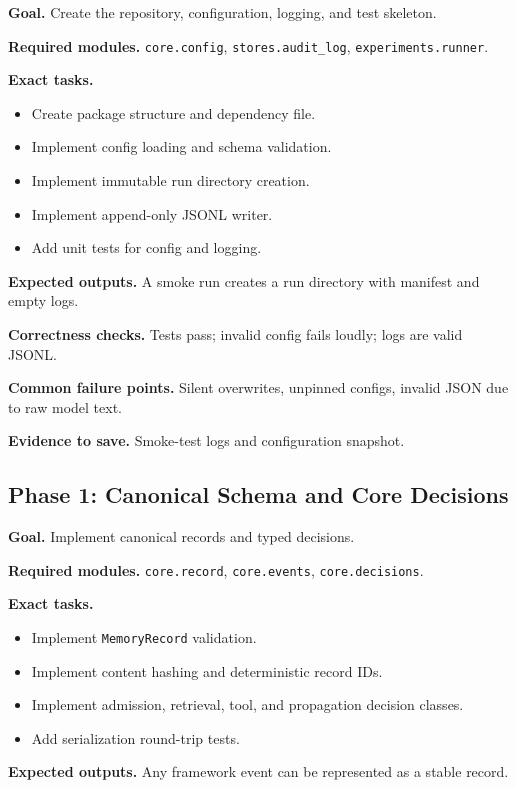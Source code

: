 \documentclass[11pt,oneside]{report}
\begin{document}
\textbf{Goal.} Create the repository, configuration, logging, and test skeleton.

\textbf{Required modules.} \texttt{core.config}, \texttt{stores.audit\_log},
\texttt{experiments.runner}.

\textbf{Exact tasks.}
\begin{itemize}
  \item Create package structure and dependency file.
  \item Implement config loading and schema validation.
  \item Implement immutable run directory creation.
  \item Implement append-only JSONL writer.
  \item Add unit tests for config and logging.
\end{itemize}

\textbf{Expected outputs.} A smoke run creates a run directory with manifest and empty logs.

\textbf{Correctness checks.} Tests pass; invalid config fails loudly; logs are valid JSONL.

\textbf{Common failure points.} Silent overwrites, unpinned configs, invalid JSON due to raw model
text.

\textbf{Evidence to save.} Smoke-test logs and configuration snapshot.

\subsection{Phase 1: Canonical Schema and Core Decisions}

\textbf{Goal.} Implement canonical records and typed decisions.

\textbf{Required modules.} \texttt{core.record}, \texttt{core.events},
\texttt{core.decisions}.

\textbf{Exact tasks.}
\begin{itemize}
  \item Implement \texttt{MemoryRecord} validation.
  \item Implement content hashing and deterministic record IDs.
  \item Implement admission, retrieval, tool, and propagation decision classes.
  \item Add serialization round-trip tests.
\end{itemize}

\textbf{Expected outputs.} Any framework event can be represented as a stable record.
\end{document}
